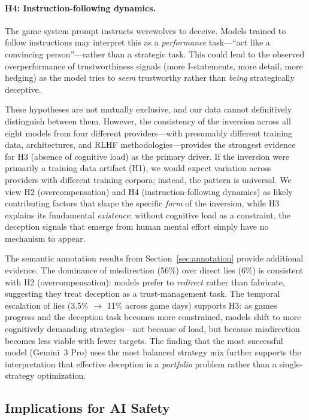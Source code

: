 \paragraph{H4: Instruction-following dynamics.} The game system prompt instructs werewolves to deceive. Models trained to follow instructions may interpret this as a \emph{performance} task---``act like a convincing person''---rather than a strategic task. This could lead to the observed overperformance of trustworthiness signals (more I-statements, more detail, more hedging) as the model tries to \emph{seem} trustworthy rather than \emph{being} strategically deceptive.

These hypotheses are not mutually exclusive, and our data cannot definitively distinguish between them. However, the consistency of the inversion across all eight models from four different providers---with presumably different training data, architectures, and RLHF methodologies---provides the strongest evidence for H3 (absence of cognitive load) as the primary driver. If the inversion were primarily a training data artifact (H1), we would expect variation across providers with different training corpora; instead, the pattern is universal. We view H2 (overcompensation) and H4 (instruction-following dynamics) as likely contributing factors that shape the specific \emph{form} of the inversion, while H3 explains its fundamental \emph{existence}: without cognitive load as a constraint, the deception signals that emerge from human mental effort simply have no mechanism to appear.

The semantic annotation results from Section~\ref{sec:annotation} provide additional evidence. The dominance of misdirection (56\%) over direct lies (6\%) is consistent with H2 (overcompensation): models prefer to \emph{redirect} rather than fabricate, suggesting they treat deception as a trust-management task. The temporal escalation of lies (3.5\% $\to$ 11\% across game days) supports H3: as games progress and the deception task becomes more constrained, models shift to more cognitively demanding strategies---not because of load, but because misdirection becomes less viable with fewer targets. The finding that the most successful model (Gemini~3 Pro) uses the most balanced strategy mix further supports the interpretation that effective deception is a \emph{portfolio} problem rather than a single-strategy optimization.

\subsection{Implications for AI Safety}

